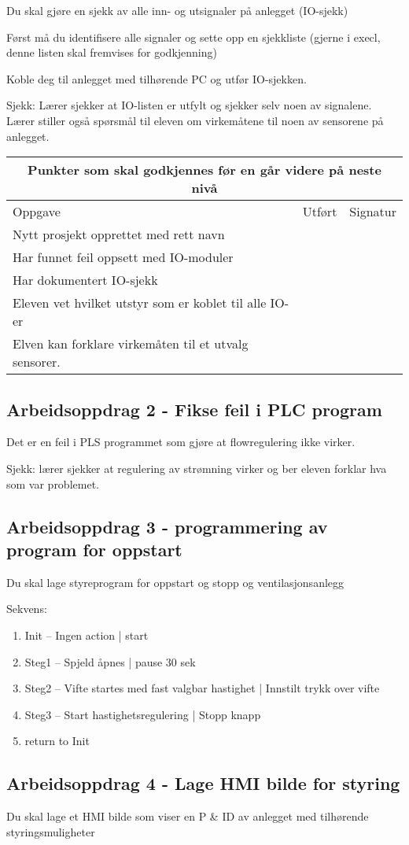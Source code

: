 Du skal gjøre en sjekk av alle inn- og utsignaler på anlegget (IO-sjekk)

Først må du identifisere alle signaler og sette opp en sjekkliste
(gjerne i execl, denne listen skal fremvises for godkjenning)

Koble deg til anlegget med tilhørende PC og utfør IO-sjekken. 

Sjekk: Lærer sjekker at IO-listen er utfylt og sjekker selv noen av
signalene. Lærer stiller også spørsmål til eleven om virkemåtene til
noen av sensorene på anlegget. 

\begin{center}
\begin{tabular}{ | m{8cm} | m{1cm}| m{2cm} | } 
\hline
\multicolumn{3}{|c|}{Punkter som skal godkjennes før en går videre på neste nivå} \\
	\hline
	Oppgave	& Utført & Signatur \\ 
	\hline
	\hline
Nytt prosjekt opprettet med rett navn	& & \\ 
	\hline
Har funnet feil oppsett med IO-moduler	& & \\ 
	\hline
Har dokumentert IO-sjekk	& & \\ 
	\hline
Eleven vet hvilket utstyr som er koblet til alle IO-er	& & \\ 
	\hline
Elven kan forklare virkemåten til et utvalg sensorer.	& & \\ 
	\hline
\end{tabular}
\end{center}
\newpage
\subsection*{Arbeidsoppdrag 2 - Fikse feil i PLC program}

Det er en feil i PLS programmet som gjøre at flowregulering ikke virker. 

Sjekk: lærer sjekker at regulering av strømning virker og ber eleven forklar hva som var problemet.
\newpage
\subsection*{Arbeidsoppdrag 3 - programmering av program for oppstart}

Du skal lage styreprogram for oppstart og stopp og ventilasjonsanlegg

Sekvens:
\begin{enumerate}
\item Init -- Ingen action |  start
\item Steg1 -- Spjeld åpnes | pause 30 sek
\item Steg2 -- Vifte startes med fast valgbar hastighet | Innstilt trykk over vifte
\item Steg3 --  Start hastighetsregulering | Stopp knapp
\item return to Init
\end{enumerate}

\subsection*{Arbeidsoppdrag 4 - Lage HMI bilde for styring}

Du skal lage et HMI bilde som viser en P \& ID av anlegget med tilhørende
styringsmuligheter



